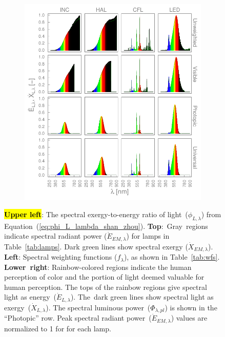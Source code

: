 \documentclass[energies,article,accept,moreauthors,pdftex]{Definitions/mdpi}\usepackage[]{graphicx}\usepackage[]{color}
\makeatletter
\def\maxwidth{ %
  \ifdim\Gin@nat@width>\linewidth
    \linewidth
  \else
    \Gin@nat@width
  \fi
}
\newenvironment{knitrout}{}{} %
\makeatother
\begin{document}
\begin{figure}[H]
\begin{subfigure}[t]{0.74\textwidth}
\begin{knitrout}
\hfill{}\includegraphics[width=\maxwidth]{figure/Responses_Graph_Energy-1} 



\end{knitrout}
        \label{fig:lamp_responses}
    \end{subfigure}%
    \caption{\hl{\textbf{Upper left}}: The spectral exergy-to-energy ratio of light~($\phi_{L,\lambda}$) 
                         from Equation~(\ref{eq:phi_L_lambda_shan_zhou}). 
             \mbox{\textbf{Top}: Gray regions} indicate spectral radiant power ($\dot{E}_{EM,\lambda}$)
                  for lamps in Table~\ref{tab:lamps}.
                  Dark green lines show spectral exergy ($\dot{X}_{EM,\lambda}$).
             \textbf{Left}: Spectral weighting functions ($f_\lambda$), as shown in Table~\ref{tab:wfs}.
             \mbox{\textbf{Lower right}}: Rainbow-colored regions indicate the human perception of color 
                          and the portion of light deemed valuable for human perception.
                          The tops of the rainbow regions give spectral light as energy~($\dot{E}_{L,\lambda}$).
                          \mbox{The dark} green lines show spectral light as exergy~($\dot{X}_{L,\lambda}$).
                          The spectral luminous power~($\Phi_{\lambda,pl}$) 
                          is shown in the ``Photopic'' row. 
             Peak spectral radiant power~($\dot{E}_{EM,\lambda}$) values are normalized to 1 for 
             for each lamp.}
	\label{fig:wfs_and_lamps}
\end{figure}
\end{document}
